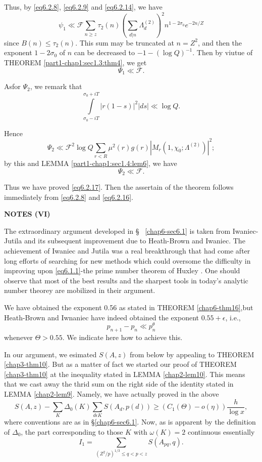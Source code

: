 Thus, by \eqref{eq6.2.8}, \eqref{eq6.2.9} and \eqref{eq6.2.14},  we have
$$
\psi_1 \ll \mathscr{F} \sum_{n \ge z} \tau_2 (n) \left(\sum_{d|n}
\Lambda^{(2)}_{d}\right)^2  n^{1-2\sigma_0} e^{-2n/Z} 
$$
since $B(n)\le \tau_2(n)$. This sum may be truncated at $n=Z^2$, and
then the exponent $1 - 2\sigma_0$ of $n$ can be decreased to
$-1-(\log Q)^{-1}$. Then by viutue of THEOREM
\ref{part1-chap1:sec1.3:thm4}, we get   
$$
\Psi_1 \ll \mathscr{F}.
$$

As\pageoriginale for $\Psi_2$, we remark that 
$$
\int\limits^{\sigma_0 + iT}_{\sigma _0 - i T} | r(1-s)|^2 |ds| \ll \log Q.
$$

Hence 
$$
\Psi _2 \ll \mathscr{F}^2 \log Q \sum_{r < R} \mu^2 (r) g (r) | M_r
(1, \chi_0 ;  \Lambda^{(2)})|^2; 
$$
by this and LEMMA \ref{part1-chap1:sec1.4:lem6}, we have
$$
\Psi_2 \ll \mathscr{F}.
$$

Thus we have proved \eqref{eq6.2.17}. Then the assertain of the theorem
follows immediately from \eqref{eq6.2.8} and \eqref{eq6.2.16}. 

\begin{center}
{\bf  NOTES (VI)}
\end{center}

The extraordinary argument developed in \S~  \ref{chap6-sec6.1} is
taken from Iwa\-niec-Jutila \cite{key34} and its subsequent improvement
\cite{key22} due to 
Heath-\break Brown and Iwaniec. The achievement of Iwaniec and Jutila was a
real breakthrough that had come after long efforts of searching for
new methods which could oversome the difficulty in improving upon
\eqref{eq6.1.1}-the prime number theorem of Huxley \cite{key25}. 
One should observe
that most of the best results and the sharpest tools in today's
analytic number theorey are mobilized in their argument. 

We have obtained the exponent 0.56 as stated in THEOREM
\ref{chap6-thm16},\pageoriginale but 
Heath-Brown and Iwnaniec have indeed obtained the exponent $0.55 +
\epsilon $, i.e., 
$$
p_{n+1} - p_n \ll p^\theta_n
$$ 
whenever $\Theta> 0.55$. We indicate here how to achieve this.

In our argument, we esimated $S(A,z)$ from below by appealing to
THEOREM \ref{chap3-thm10}. But as a matter of fact we started our
proof of THEOREM \ref{chap3-thm10} at the inequality stated in LEMMA
\ref{chap2-lem10}. This means that we cast 
away the thrid sum on the right side of the identity stated in LEMMA
\ref{chap2-lem9}. Namely, we have actually proved in the above  
$$
S(A, z)- \sum_{K} \Delta_0 (K) \sum_{d \epsilon  K} S(A_d, p(d)) \ge
(C_1 (\Theta)- o(\eta)) \frac{h}{\log x}, 
$$ 
where conventions are as in \S \ref{chap6-sec6.1}. Now, as is apparent by the
definition of $\Delta_0$, the part corresponding to those $K$ with
$\omega (K)=2$ continuous essentially 
$$
I_1 = \sum_{(Z^2/p)^{1/3} \le q < p < z} S(A_{pq},q).
$$ 

